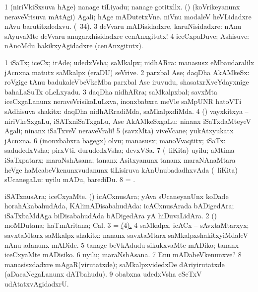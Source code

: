 {{{{{{\noindent
\gl{\pagu}
\expl{}
\bmng
\bnum
\num{1} (niriVkiSxsuva hAge) nanage tiLiyadu; nanage gotitxllx. 
  (\AmA) 
\banum
{} (koVrikeyanunx neraveVrisuva mAtAgi) Agali; hAge mADutetxVne.  niVnu modaleV heVLidadxre nAvu barutitxdedxvu. 
  (\pagu\ $34$). 
\eanum
\numie
\num{3}  deVvaru mADisidadxre, karuNisidadxre:  nAnu sAyuvaMte deVvaru anugarxhisidadxre cenAnxgitutx! 
\num{4}  iceCxpaDuve; Ashisuve:  nAnoMdu hakikxyAgidadxre (cenAnxgitutx). 
\enum
\emng
\eentry

\bentry
{} 
\gl{\nA}
\bmng
\bnum
\num{1} iSaTx; iceCx; irAde; udedxVsha; saMkalpx; nidhARra:  manasusx eMbaudaralilx jAcnxna matutx saMkalpx (eraDU) seVrive. 
\num{2} parxbal Ase; daqDha AkAMkeSx:  roVgige tAnu badukaleVbeVkeMba parxbal Ase iruvudu, shasatxrXveYdayxnige bahaLaSuTx oLeLxyadu. 
\num{3} daqDha nidhARra; saMkalpxbal; savxMta iceCxgaLanunx neraveVrisikoLuLxva, inonxbabxra meVle saMpUNR hatoVTi sAdhisuva shakitx:  daqDha nidhARradiMda, saMkalpxdiMda. 
\num{4} (\pArxparx) vayxkitxya -- niriVkeSxgaLu, iSATxniSaTxgaLu, Ase AkAMkeSxgaLu:  ninanx iSaTxdaMteyeV Agali; ninanx iSaTxveV neraveVrali! 
\num{5} (savxMta) viveVcane; yukAtxyukatx jAcnxna. 
\num{6} (inonxbabxra bagegx) olvu; manasusx; manoVvaqtitx; iSaTx:  sadudedxVsha; pirxVti.  durudedxVsha; devxVSa. 
\num{7} (\sA\ liKita) uyilu; aMtima iSaTxpatarx; maraNshAsana; tananx Asitxyanunx tananx maraNAnaMtara heVge haMcabeVkenunxvudanunx tiLisiruva kAnUnubadadhxvAda (\sA\ liKita) sUcanegaLu:  uyilu mADu, barediDu. 
\num{8} = . 
\enum
\emng

\noindent
\gl{\pagu}
\bmng
\bnum
{}  
\banum
{} iSATxnusAra; iceCxyaMte. 
 (\nAyxshA) icACxnusAra; yAva sUcaneyanUnx koDade horahAkabahudAda, KAlimADisabahudAda:  icACxnusArada bADigedAra; iSaTxbaMdAga biDisabahudAda bADigedAra yA hiDuvaLidAra. 
\eanum
\numie
\num{2}  (\sw) moMDutana; haTmAritana; Cal. 
\num{3}  = \hyperlink{will pagu4}{\pagu ($4$).} 
\hypertarget{will pagu4}{} 
\num{4} saMkalpx, icACx -- sAvxtaMtarxyx; savxtaMtarx saMkalpx shakitx:  nananx savxtaMtarx saMkalpxshakitxyiMdaleV nAnu adanunx mADide. 
\num{5}  tanage beVkAdudu sikukxvaMte mADiko; tananx iceCxyaMte mADisiko. 
\num{6}  uyilu; maraNshAsana. 
\num{7}  Enu mADabeVkenunxve? 
\num{8}  manasisxdadxre mAgaR(virutatxde); saMkalpxvidedxDe dAriyirutatxde (aDacaNegaLanunx dATbahudu). 
\num{9}  obabxna udedxVsha eSeTxV udAtatxvAgidadxrU. 
\enum
\emng
\eentry

}}}}}}
